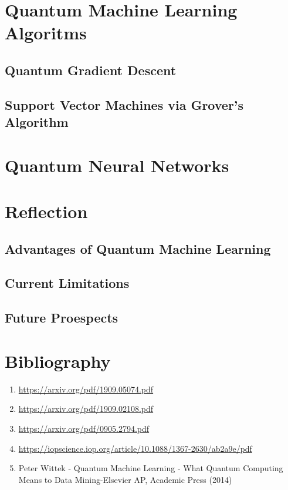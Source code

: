 \documentclass[hidelinks,12pt]{article}
\begin{document}
\newpage
\section{Quantum Machine Learning Algoritms}
\subsection{Quantum Gradient Descent}
\subsection{Support Vector Machines via Grover's Algorithm}
\newpage
\section{Quantum Neural Networks}
\newpage
\section{Reflection}
\subsection{Advantages of Quantum Machine Learning}
\subsection{Current Limitations}
\subsection{Future Proespects}
\newpage
\section{Bibliography}
\begin{enumerate}
    \item \url{https://arxiv.org/pdf/1909.05074.pdf}
    \item \url{https://arxiv.org/pdf/1909.02108.pdf}
    \item \url{https://arxiv.org/pdf/0905.2794.pdf}
    \item \url{https://iopscience.iop.org/article/10.1088/1367-2630/ab2a9e/pdf}
    \item Peter Wittek - Quantum Machine Learning - What Quantum Computing Means to Data Mining-Elsevier AP, Academic Press (2014)
\end{enumerate}
\end{document}

